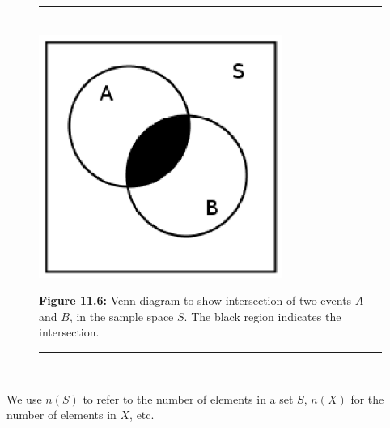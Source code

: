 	\begin{figure}[H] %
    \begin{center}
    \rule[.1in]{\figurerulewidth}{.005in} \\
        \label{m39377*uid1381!!!underscore!!!media}\label{m39377*uid1381!!!underscore!!!printimage}\includegraphics[width=300px]{col11306.imgs/m39377_intersect.png} %
        
      \vspace{2pt}
    \vspace{\rubberspace}\par \begin{cnxcaption}
	  \small \textbf{Figure 11.6: }Venn diagram to show intersection of two events
\begin{math}A\end{math} and \begin{math}B\end{math}, in the sample space \begin{math}S\end{math}. The black region indicates the
intersection.
	\end{cnxcaption}
      
    \vspace{.1in}
    \rule[.1in]{\figurerulewidth}{.005in} \\
        
    \end{center}

 \end{figure}   

    \addtocounter{footnote}{-0}
    

\label{m39377*eip-805}We use \begin{math}n\left(S\right)\end{math} to refer to the number of elements in a set \begin{math}S\end{math}, \begin{math}n\left(X\right)\end{math} for the number of elements in \begin{math}X\end{math}, etc.\par \label{m39377*secfhsst!!!underscore!!!id141}\vspace{.5cm} 
      
